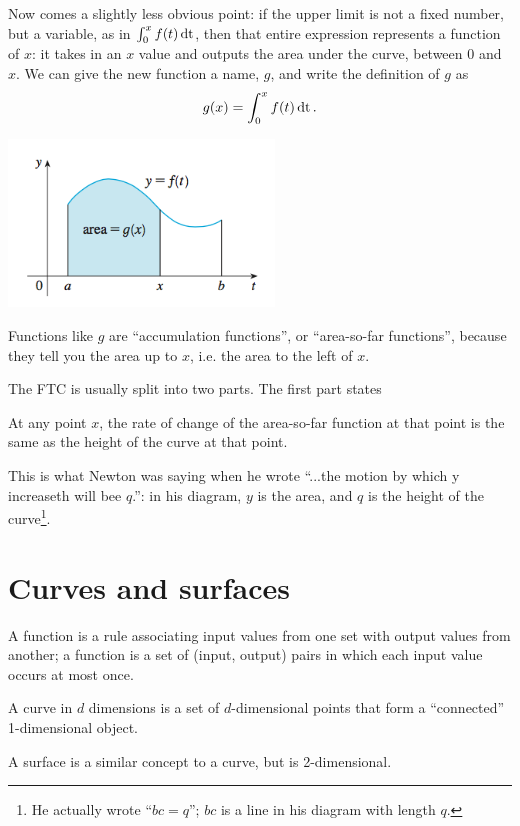 Now comes a slightly less obvious point: if the upper limit is not a fixed
number, but a variable, as in $\int_0^{x} f(t) \operatorname{\text{dt}}$, then that entire
expression represents a function of $x$: it takes in an $x$ value and outputs
the area under the curve, between 0 and $x$. We can give the new function a
name, $g$, and write the definition of $g$ as
\begin{align*}
  g(x) = \int_0^{x} f(t) \operatorname{\text{dt}}.
\end{align*}

\includegraphics[width=200pt]{img/stewart-ftc-1.png}

Functions like $g$ are ``accumulation functions'', or ``area-so-far
functions'', because they tell you the area up to $x$, i.e. the area to the
left of $x$.

The FTC is usually split into two parts. The first part states\\
\begin{mdframed}
  At any point $x$, the rate of change of the area-so-far function at that
  point is the same as the height of the curve at that point.
\end{mdframed}

This is what Newton was saying when he wrote ``...the motion by which y
increaseth will bee $q$.'': in his diagram, $y$ is the area, and $q$ is the
height of the curve\footnote{He actually wrote ``$bc=q$''; $bc$ is a line in
  his diagram with length $q$.}.

\newpage
\section{Curves and surfaces}

A function is a rule associating input values from one set with output values
from another; a function is a set of (input, output) pairs in which each input
value occurs at most once.

A curve in $d$ dimensions is a set of $d$-dimensional points that form a
``connected'' 1-dimensional object.

A surface is a similar concept to a curve, but is 2-dimensional.

